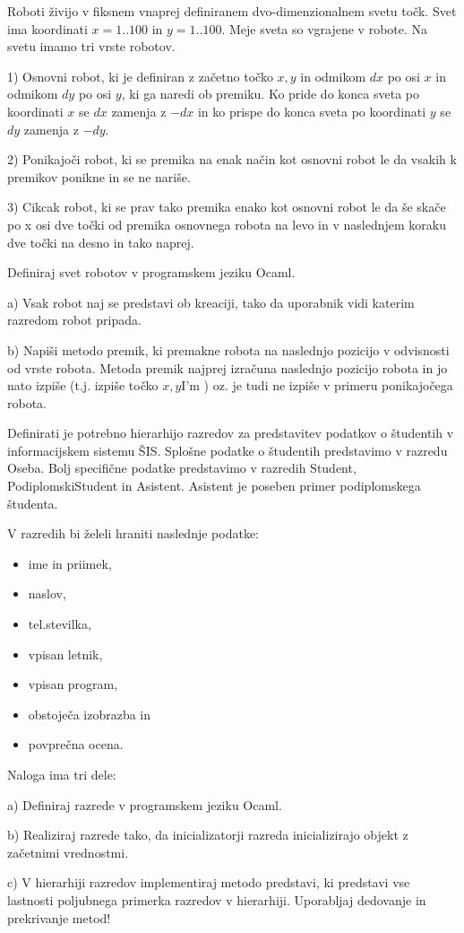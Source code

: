\begin{ex}
Roboti \v zivijo v fiksnem vnaprej definiranem dvo-dimenzionalnem svetu to\v ck. Svet ima koordinati $x=1..100$ in $y=1..100$. Meje sveta so vgrajene v robote. Na svetu imamo tri vrste robotov.

1) Osnovni robot, ki je definiran z za\v cetno to\v cko $x,y$ in odmikom $dx$ po osi $x$ in odmikom $dy$ po osi $y$, ki ga naredi ob premiku. Ko pride do konca sveta po koordinati $x$ se $dx$ zamenja z $-dx$ in ko prispe do konca sveta po koordinati $y$ se $dy$ zamenja z $-dy$.

2) Ponikajo\v ci robot, ki se premika na enak na\v cin kot osnovni robot le da vsakih k premikov ponikne in se ne nari\v se.

3) Cikcak robot, ki se prav tako premika enako kot osnovni robot le da \v se ska\v ce po x osi dve to\v cki od premika osnovnega robota na levo in v naslednjem koraku dve to\v cki na desno in tako naprej.

Definiraj svet robotov v programskem jeziku Ocaml. 

a) Vsak robot naj se predstavi ob kreaciji, tako da uporabnik vidi katerim razredom robot pripada.

b) Napi\v si metodo premik, ki premakne robota na naslednjo pozicijo v odvisnosti od vrste robota. Metoda premik najprej izra\v cuna naslednjo pozicijo robota in jo nato izpi\v se (t.j. izpi\v se to\v cko $x,y$I’m ) oz. je tudi ne izpi\v se v primeru ponikajo\v cega robota.



\end{ex}
\begin{ex}
Definirati je potrebno hierarhijo razredov za predstavitev podatkov o \v studentih v informacijskem sistemu \v SIS. Splo\v sne podatke o \v studentih predstavimo v razredu Oseba. Bolj specifi\v cne podatke predstavimo v razredih Student, PodiplomskiStudent in Asistent.
Asistent je poseben primer podiplomskega \v studenta. 

V razredih bi \v zeleli hraniti naslednje podatke: 
\begin{itemize}
    \item  ime in priimek, 
    \item  naslov, 
    \item  tel.stevilka, 
    \item  vpisan letnik, 
    \item  vpisan program, 
    \item  obstoje\v ca izobrazba in 
    \item  povpre\v cna ocena. 
\end{itemize}
Naloga ima tri dele:

a) Definiraj razrede v programskem jeziku Ocaml.

b) Realiziraj razrede tako, da inicializatorji razreda inicializirajo objekt z za\v cetnimi vrednostmi.

c) V hierarhiji razredov implementiraj metodo predstavi, ki predstavi vse lastnosti poljubnega primerka razredov v hierarhiji. Uporabljaj dedovanje in prekrivanje metod!



\end{ex}
